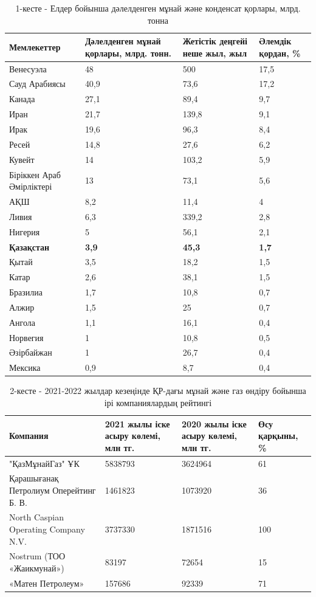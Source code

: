 \begin{table}[H]
\caption*{1-кесте - Елдер бойынша дәлелденген мұнай және конденсат қорлары, млрд. тонна}
\centering
\begin{tabular}{|l|p{}|p{}|l|}
\hline
\textbf{Мемлекеттер} & \textbf{Дәлелденген мұнай қорлары, млрд. тонн.} & \textbf{Жетістік деңгейі неше жыл, жыл} & \textbf{Әлемдік қордан, \%} \\ \hline
Венесуэла & 48 & 500 & 17,5 \\ \hline
Сауд Арабиясы & 40,9 & 73,6 & 17,2 \\ \hline
Канада & 27,1 & 89,4 & 9,7 \\ \hline
Иран & 21,7 & 139,8 & 9,1 \\ \hline
Ирак & 19,6 & 96,3 & 8,4 \\ \hline
Ресей & 14,8 & 27,6 & 6,2 \\ \hline
Кувейт & 14 & 103,2 & 5,9 \\ \hline
Біріккен Араб Әмірліктері & 13 & 73,1 & 5,6 \\ \hline
АҚШ & 8,2 & 11,4 & 4 \\ \hline
Ливия & 6,3 & 339,2 & 2,8 \\ \hline
Нигерия & 5 & 56,1 & 2,1 \\ \hline
\textbf{Қазақстан} & \textbf{3,9} & \textbf{45,3} & \textbf{1,7} \\ \hline
Қытай & 3,5 & 18,2 & 1,5 \\ \hline
Катар & 2,6 & 38,1 & 1,5 \\ \hline
Бразилиа & 1,7 & 10,8 & 0,7 \\ \hline
Алжир & 1,5 & 25 & 0,7 \\ \hline
Ангола & 1,1 & 16,1 & 0,4 \\ \hline
Норвегия & 1 & 10,8 & 0,5 \\ \hline
Әзірбайжан & 1 & 26,7 & 0,4 \\ \hline
Мексика & 0,9 & 8,7 & 0,4 \\ \hline
\end{tabular}
\end{table}

\begin{table}[H]
\caption*{2-кесте - 2021-2022 жылдар кезеңінде ҚР-дағы мұнай және газ өндіру бойынша ірі компаниялардың рейтингі}
\centering
\begin{tabular}{|p{}|p{}|p{}|p{}|}
\hline
Компания & 2021 жылы іске асыру көлемі, млн тг. & 2020 жылы іске асыру көлемі, млн тг. & Өсу қарқыны, \% \\ \hline
"ҚазМұнайГаз" ҰК & 5838793 & 3624964 & 61 \\ \hline
Қарашығанақ Петролиум Оперейтинг Б. В. & 1461823 & 1073920 & 36 \\ \hline
North Caspian Operating Company N.V. & 3737330 & 1871516 & 100 \\ \hline
Nostrum (ТОО «Жаикмунай») & 83197 & 72654 & 15 \\ \hline
«Матен Петролеум» & 157686 & 92339 & 71 \\ \hline
\end{tabular}
\end{table}

